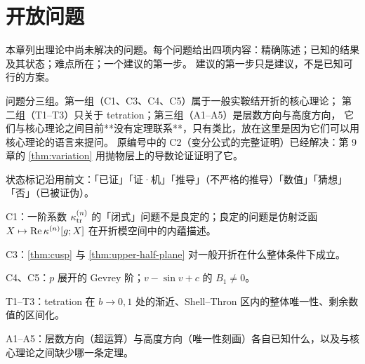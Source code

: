 \providecommand{\STreg}{\mathcal{ST}}          %
\providecommand{\Ftr}{F^{\mathrm{tr}}}         %
\providecommand{\Uup}{\mathcal U^{+}}          %

\chapter{开放问题}\label{ch:open}

本章列出理论中尚未解决的问题。每个问题给出四项内容：精确陈述；已知的结果及其状态；难点所在；一个建议的第一步。
建议的第一步只是建议，不是已知可行的方案。

问题分三组。第一组（C1、C3、C4、C5）属于一般实鞍结开折的核心理论；
第二组（T1--T3）只关于 tetration；第三组（A1--A5）是层数方向与高度方向，
它们与核心理论之间目前**没有定理联系**，只有类比，放在这里是因为它们可以用核心理论的语言来提问。
原编号中的 C2（变分公式的完整证明）已经解决：第 9 章的 \cref{thm:variation} 用抛物层上的导数论证证明了它。

状态标记沿用前文：「已证」「证·机」「推导」（不严格的推导）「数值」「猜想」「否」（已被证伪）。

\begin{goals}
\item C1：一阶系数 $\kappa_{\mathrm{tr}}^{(n)}$ 的「闭式」问题不是良定的；良定的问题是仿射泛函 $X\mapsto\operatorname{Re}\kappa^{(n)}[g;X]$ 在开折模空间中的内蕴描述。
\item C3：\cref{thm:cusp} 与 \cref{thm:upper-half-plane} 对一般开折在什么整体条件下成立。
\item C4、C5：$p$ 展开的 Gevrey 阶；$v-\sin v+c$ 的 $B_1\neq0$。
\item T1--T3：tetration 在 $b\to0,1$ 处的渐近、Shell--Thron 区内的整体唯一性、剩余数值的区间化。
\item A1--A5：层数方向（超运算）与高度方向（唯一性刻画）各自已知什么，以及与核心理论之间缺少哪一条定理。
\end{goals}

